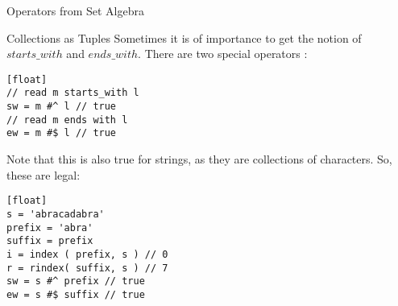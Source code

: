 \begin{section}{Operators from Set Algebra}
\begin{subsection}{Collections as Tuples}
Sometimes it is of importance to get the notion of $starts\_with$ and $ends\_with$.
There are two special operators :

\begin{lstlisting}[style=JexlStyle][float]
// read m starts_with l 
sw = m #^ l // true 
// read m ends with l 
ew = m #$ l // true 
\end{lstlisting}

Note that this is also true for strings, as they are collections of characters.
So, these are legal:

\begin{lstlisting}[style=JexlStyle][float]
s = 'abracadabra'
prefix = 'abra'
suffix = prefix
i = index ( prefix, s ) // 0 
r = rindex( suffix, s ) // 7 
sw = s #^ prefix // true 
ew = s #$ suffix // true 
\end{lstlisting}

\end{subsection}

\end{section}


